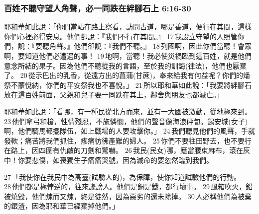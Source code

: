 \subsubsection{百姓不聽守望人角聲，必一同跌在絆腳石上 6:16-30}
耶和華如此說：「你們當站在路上察看，訪問古道，哪是善道，便行在其間，這樣你們心裡必得安息。他們卻說：『我們不行在其間。』 17 我設立守望的人照管你們，說：『要聽角聲。』他們卻說：『我們不聽。』 18 列國啊，因此你們當聽！會眾啊，要知道他們必遭遇的事！ 19 地啊，當聽！我必使災禍臨到這百姓，就是他們意念所結的果子。因為他們不聽從我的言語，至於我的訓誨(律法)，他們也厭棄了。 20 從示巴出的乳香，從遠方出的菖蒲(甘蔗)，奉來給我有何益呢？你們的燔祭不蒙悅納，你們的平安祭我也不喜悅。」 21 所以耶和華如此說：「我要將絆腳石放在這百姓前面，父親和兒子要一同跌在其上，鄰舍與朋友也都滅亡。」


耶和華如此說：「看哪，有一種民從北方而來，並有一大國被激動，從地極來到。 23 他們拿弓和槍，性情殘忍，不施憐憫，他們的聲音像海浪砰訇。錫安城(女子)啊，他們騎馬都擺隊伍，如上戰場的人要攻擊你。」 24 我們聽見他們的風聲，手就發軟；痛苦將我們抓住，疼痛彷彿產難的婦人。 25 你們不要往田野去，也不要行在路上，因四圍有仇敵的刀劍和驚嚇。 26 我民(民女)哪，應當腰束麻布，滾在灰中！你要悲傷，如喪獨生子痛痛哭號，因為滅命的要忽然臨到我們。

27 「我使你在我民中為高臺(試驗人的)，為保障，使你知道試驗他們的行動。 28 他們都是極悖逆的，往來讒謗人。他們是銅是鐵，都行壞事。 29 風箱吹火，鉛被燒毀，他們煉而又煉，終是徒然，因為惡劣的還未除掉。 30 人必稱他們為被棄的銀渣，因為耶和華已經棄掉他們。」



